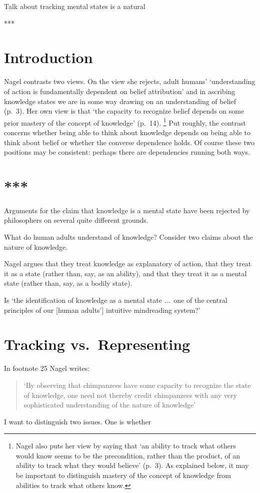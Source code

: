 \documentclass[11pt,a4paper]{extarticle}
\begin{document}
Talk about tracking mental states is a natural 

***




\section{Introduction}
Nagel contrasts two views.
On the view she rejects, adult humans' `understanding of action is fundamentally dependent on belief attribution' and in ascribing knowledge states we are in some way drawing on an understanding of belief (p.\ 3).
Her own view is that `the capacity to recognize belief depends on some prior mastery of the concept of knowledge' (p.\ 14).%
\footnote{
Nagel also puts her view by saying that `an ability to track what others would know seems to be the precondition, rather than the product, of an ability to track what they would believe' (p.\ 3).
As explained below, it may be important to distinguish mastery of the concept of knowledge from abilities to track what others know.
}
Put roughly, the contrast concerns whether being able to think about knowledge depends on being able to think about belief or whether the converse dependence holds.
Of course these two positions may be consistent: perhaps there are dependencies running both ways.  





\section{***}
Arguments for the claim that knowledge is a mental state have been rejected by philosophers on several quite different grounds.

What do human adults understand of knowledge?
Consider two claims about the nature of knowledge.



Nagel argues that they treat knowledge as explanatory of action, that they treat it as a state (rather than, say, as an ability), and that they treat it as a mental state (rather than, say, as a bodily state).
 

Is `the identification of knowledge as a mental state ...\ one of the central principles of our [human adults'] intuitive mindreading system?'




\section{Tracking vs.\ Representing}




In footnote 25 Nagel writes:
%
\begin{quote}
`By observing that chimpanzees have some capacity to recognize the state of knowledge, one need not thereby credit chimpanzees with any very sophisticated understanding of the nature of knowledge'
\end{quote}
%
I want to distinguish two issues.
One is whether 





\end{document}
